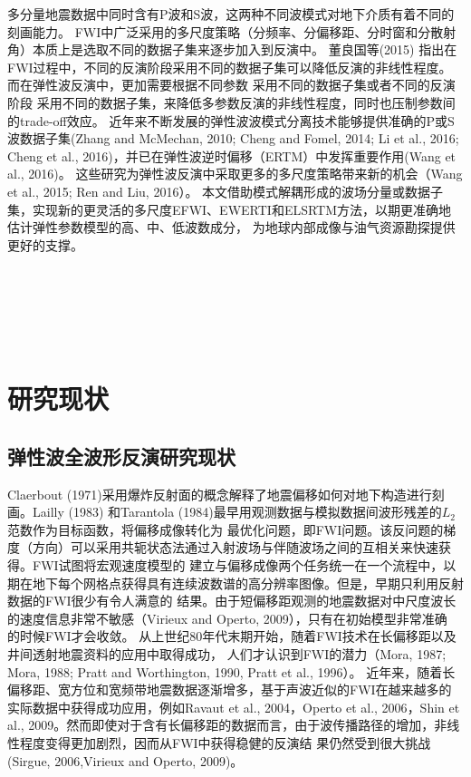 多分量地震数据中同时含有P波和S波，这两种不同波模式对地下介质有着不同的刻画能力。
FWI中广泛采用的多尺度策略（分频率、分偏移距、分时窗和分散射角）本质上是选取不同的数据子集来逐步加入到反演中。
董良国等(2015)\cite{董良国2015}
指出在FWI过程中，不同的反演阶段采用不同的数据子集可以降低反演的非线性程度。而在弹性波反演中，更加需要根据不同参数
采用不同的数据子集或者不同的反演阶段
采用不同的数据子集，来降低多参数反演的非线性程度，同时也压制参数间的trade-off效应。
近年来不断发展的弹性波波模式分离技术能够提供准确的P或S波数据子集(Zhang and McMechan,
2010\cite{zhang.mcmechan:2010}; Cheng and Fomel,
2014\cite{cheng:2014b}; Li et al., 2016\cite{Li2016a}; Cheng et al.,
2016\cite{cheng:2016})，并已在弹性波逆时偏移（ERTM）中发挥重要作用(Wang et al.,
2016\cite{wang2016scalar})。
这些研究为弹性波反演中采取更多的多尺度策略带来新的机会（Wang et al., 2015\cite{wang:2015}; Ren and
Liu, 2016\cite{ren.liu:2016}）。
本文借助模式解耦形成的波场分量或数据子集，实现新的更灵活的多尺度EFWI、EWERTI和ELSRTM方法，以期更准确地估计弹性参数模型的高、中、低波数成分，
为地球内部成像与油气资源勘探提供更好的支撑。

$\quad$

$\quad$

$\quad$
\section{研究现状}
\subsection{弹性波全波形反演研究现状}
Claerbout
(1971\cite{Claerbout1971})采用爆炸反射面的概念解释了地震偏移如何对地下构造进行刻画。Lailly
(1983)\cite{lailly1983seismic}
和Tarantola (1984)\cite{tarantola1984}最早用观测数据与模拟数据间波形残差的$L_2$范数作为目标函数，将偏移成像转化为
最优化问题，即FWI问题。该反问题的梯度（方向）可以采用共轭状态法通过入射波场与伴随波场之间的互相关来快速获得。FWI试图将宏观速度模型的
建立与偏移成像两个任务统一在一个流程中，以期在地下每个网格点获得具有连续波数谱的高分辨率图像。但是，早期只利用反射数据的FWI很少有令人满意的
结果。由于短偏移距观测的地震数据对中尺度波长的速度信息非常不敏感（Virieux and Operto,
2009\cite{virieux2009overview}），只有在初始模型非常准确
的时候FWI才会收敛。
从上世纪80年代末期开始，随着FWI技术在长偏移距以及井间透射地震资料的应用中取得成功，
人们才认识到FWI的潜力（Mora, 1987\cite{mora:1987}; Mora, 1988\cite{mora1988elastic}; Pratt
and Worthington, 1990\cite{PRATTEtAl1990}, Pratt et al., 1996\cite{pratt1996two}）。
近年来，随着长偏移距、宽方位和宽频带地震数据逐渐增多，基于声波近似的FWI在越来越多的实际数据中获得成功应用，例如Ravaut
et al., 2004\cite{RavautEtAl2004}，Operto et al., 2006\cite{Operto2006}，Shin et al.,
2009\cite{ShinEtAl2009}。然而即使对于含有长偏移距的数据而言，由于波传播路径的增加，非线性程度变得更加剧烈，因而从FWI中获得稳健的反演结
果仍然受到很大挑战(Sirgue, 2006\cite{sirgue2006importance},Virieux and Operto,
2009\cite{virieux2009overview})。

